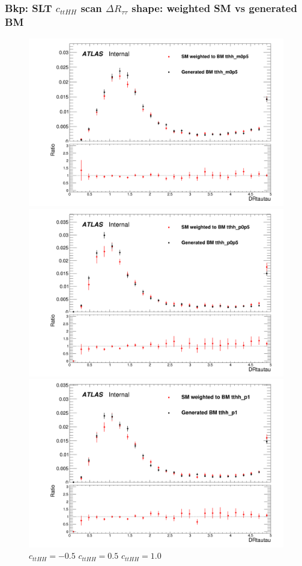\documentclass[twoside,11pt]{beamer}
\begin{document}
\begin{frame}
    \frametitle{Bkp: SLT $c_{ttHH}$ scan $\Delta R_{\tau\tau}$ shape: weighted SM vs generated BM}
\begin{figure}
    \includegraphics[width=.32\textwidth]{figures/Method_B_all_latest/BMtthh_m0p5h_DRtautau.png}
    \includegraphics[width=.32\textwidth]{figures/Method_B_all_latest/BMtthh_p0p5h_DRtautau.png}
    \includegraphics[width=.32\textwidth]{figures/Method_B_all_latest/BMtthh_p1h_DRtautau.png}
    $c_{ttHH} = -0.5$ \hspace{5em} $c_{ttHH} = 0.5$\hspace{5em} $c_{ttHH} = 1.0$    
\end{figure}

\end{frame}   
\end{document}
